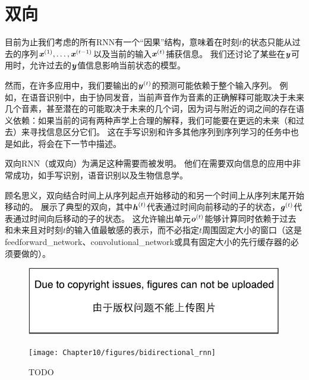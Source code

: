 
\section{双向}
\label{sec:bidirectional_rnns}
目前为止我们考虑的所有\gls{RNN}有一个``因果''结构，意味着在时刻$t$的状态只能从过去的序列$\boldsymbol{\mathit{x}}^{(1)},\dots,\boldsymbol{\mathit{x}}^{(t-1)}$以及当前的输入$\boldsymbol{\mathit{x}}^{(t)}$捕获信息。
我们还讨论了某些在$\boldsymbol{\mathit{y}}$可用时，允许过去的$\boldsymbol{\mathit{y}}$值信息影响当前状态的模型。

然而，在许多应用中，我们要输出的$\boldsymbol{\mathit{y}}^{(t)}$的预测可能依赖于整个输入序列。
例如，在语音识别中，由于协同发音，当前声音作为音素的正确解释可能取决于未来几个音素，甚至潜在的可能取决于未来的几个词，因为词与附近的词之间的存在语义依赖：如果当前的词有两种声学上合理的解释，我们可能要在更远的未来（和过去）来寻找信息区分它们。
这在手写识别和许多其他序列到序列学习的任务中也是如此，将会在下一节中描述。

双向\gls{RNN}（或双向）为满足这种需要而被发明\citep{Schuster+Paliwal-1997}。
他们在需要双向信息的应用中非常成功\citep{Graves-book2012}，如手写识别\citep{Graves-et-al-NIPS2007,Graves+Schmidhuber-2009}，语音识别\citep{Graves+Schmidhuber-2005,Graves-et-al-ICASSP2013}以及生物信息学\citep{Baldi-et-al-1999}。

顾名思义，双向结合时间上从序列起点开始移动的和另一个时间上从序列末尾开始移动的。
展示了典型的双向，其中$\boldsymbol{\mathit{h}}^{(t)}$代表通过时间向前移动的子的状态，$\boldsymbol{\mathit{g}}^{(t)}$代表通过时间向后移动的子的状态。
这允许输出单元$\boldsymbol{\mathit{o}}^{(t)}$能够计算同时依赖于过去和未来且对时刻$t$的输入值最敏感的表示，而不必指定$t$周围固定大小的窗口（这是\gls{feedforward_network}、\gls{convolutional_network}或具有固定大小的先行缓存器的必须要做的）。


\begin{figure}[!htb]
\ifOpenSource
\centerline{\includegraphics{figure.pdf}}
\else
\centerline{\texttt{[image: Chapter10/figures/bidirectional\_rnn]}}
\fi
\caption{TODO}
\label{fig:chap10_bidirectional_rnn}
\end{figure}


